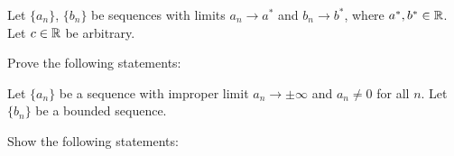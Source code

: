 \documentclass[week=3]{homework}
\date{\today}
\begin{document}
    \maketitle
    \thispagestyle{empty}
    \newpage
    \begin{questions}
		\let\firstquestion\question
		\renewcommand*{\question}{\vspace{7mm}\firstquestion}
        \firstquestion
        Let $\{a_n\}$, $\{b_n\}$ be sequences with limits $a_n \to a^*$ and $b_n \to b^*$, where $a^*,b^* \in \mathbb{R}$. Let $c\in\mathbb{R}$ be arbitrary.
        
        Prove the following statements:
    
	    \question
	    Let $\{a_n\}$ be a sequence with improper limit $a_n \to \pm\infty$ and $a_n \neq 0$ for all $n$. Let $\{b_n\}$ be a bounded sequence.
	    
	    Show the following statements:
\end{questions}
\end{document}
